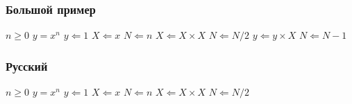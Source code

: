 \subsubsection{Большой пример}

\begin{algorithmic}
	\REQUIRE $n \geq 0$
	\ENSURE $y = x^n$
	\STATE $y \Leftarrow 1$
	\STATE $X \Leftarrow x$
	\STATE $N \Leftarrow n$
			\STATE $X \Leftarrow X \times X$
			\STATE $N \Leftarrow N / 2$
		\ELSE[$N$ is odd]
			\STATE $y \Leftarrow y \times X$
			\STATE $N \Leftarrow N - 1$
		\ENDIF
	\ENDWHILE
\end{algorithmic}

\subsubsection{Русский}

\realgorithmic

\begin{algorithmic}
	\REQUIRE $n \geq 0$
	\ENSURE $y = x^n$
	\STATE $y \Leftarrow 1$
	\STATE $X \Leftarrow x$
	\STATE $N \Leftarrow n$
			\STATE $X \Leftarrow X \times X$
			\STATE $N \Leftarrow N / 2$
		\ENDIF
	\ENDWHILE
\end{algorithmic}

\pagebreak %
